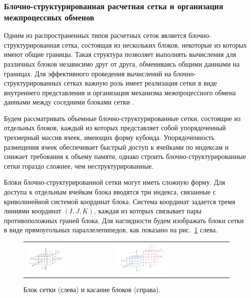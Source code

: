 \subsubsection{Блочно-структурированная расчетная сетка и организация межпроцессных обменов}\label{sec:par_block_struct_mesh}

Одним из распространенных типов расчетных сеток является блочно-структурированная сетка, состоящая из нескольких блоков, некоторые из которых имеют общие границы.
Такая структура позволяет выполнять вычисления для различных блоков независимо друг от друга, обмениваясь общими данными на границах.
Для эффективного проведения вычислений на блочно-структурированных сетках важную роль имеет реализация сетки в виде внутреннего представления и организация механизма межпроцессного обмена данными между соседними блоками сетки \cite{Rybakov2017Mesh}.

Будем рассматривать объемные блочно-структурированные сетки, состоящие из отдельных блоков, каждый из которых представляет собой упорядоченный трехмерный массив ячеек, имеющих форму кубоида.
Упорядоченность размещения ячеек обеспечивает быстрый доступ к ячейками по индексам и снижает требования к объему памяти, однако строить блочно-структурированные сетки гораздо сложнее, чем неструктурированные.

Блоки блочно-структурированной сетки могут иметь сложную форму.
Для доступа к отдельным ячейкам блока вводятся три индекса, связанные с криволинейной системой координат блока.
Система координат задается тремя линиями координат $(I, J, K)$, каждая из которых связывает пары противоположных граней блока.
Для наглядности будем изображать блоки сетки в виде прямоугольных параллелепипедов, как показано на рис.~\ref{fig:text_2_block_block} слева.

\begin{figure}[ht]
\centering
\begin{tabular}{ll}
\includegraphics[width=0.45\textwidth]{fig/par_1-block.pdf}
&
\includegraphics[width=0.45\textwidth]{fig/par_2-block-block.pdf}
\end{tabular}
\singlespacing
{}\caption{Блок сетки (слева) и касание блоков (справа).}
\label{fig:text_2_block_block}
\end{figure}

